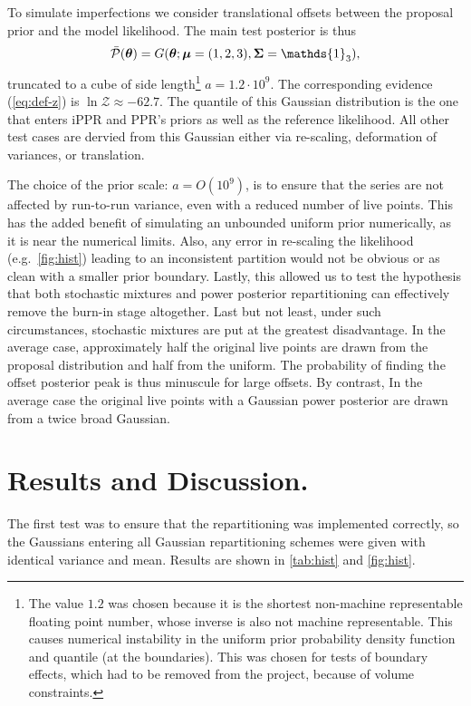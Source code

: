 \documentclass[usenatbib]{mnras}
\begin{document}
To simulate imperfections we consider translational offsets between
the proposal prior and the model likelihood.  The main test posterior
is thus
\begin{equation}
\bar{{\cal P}}(\bm{\theta}) = G(\bm{\theta}; \bm{\mu} =
  (1,2,3),\bm{\Sigma} = \mathds{1}_{3}),
\end{equation}
truncated to a cube of side length\footnote{The value \(1.2\) was
  chosen because it is the shortest non-machine representable floating
  point number, whose inverse is also not machine representable. This
  causes numerical instability in the uniform prior probability
  density function and quantile (at the boundaries). This was chosen
  for tests of boundary effects, which had to be removed from the
  project, because of volume constraints. } \(a = 1.2 \cdot
10^{9}\). The corresponding evidence (\cref{eq:def-z}) is
\(\ln \mathcal{Z}\approx-62.7\). The quantile of this Gaussian
distribution is the one that enters iPPR and PPR's priors as well as
the reference likelihood. All other test cases are dervied from this
Gaussian either via re-scaling, deformation of variances, or
translation.

The choice of the prior scale: \(a = O(10^{9})\), is to ensure that
the series are not affected by run-to-run variance, even with a
reduced number of live points. This has the added benefit of
simulating an unbounded uniform prior numerically, as it is near the
numerical limits. Also, any error in re-scaling the likelihood
(e.g.~\cref{fig:hist}) leading to an inconsistent partition would not
be obvious or as clean with a smaller prior boundary. Lastly, this
allowed us to test the hypothesis that both stochastic mixtures and
power posterior repartitioning can effectively remove the burn-in
stage altogether. Last but not least, under such circumstances,
stochastic mixtures are put at the greatest disadvantage. In the
average case, approximately half the original live points are drawn
from the proposal distribution and half from the uniform. The
probability of finding the offset posterior peak is thus minuscule for
large offsets. By contrast, In the average case the original live
points with a Gaussian power posterior are drawn from a twice broad
Gaussian.



\section{Results and Discussion.}\label{sec:results}
The first test was to ensure that the repartitioning was implemented
correctly, so the Gaussians entering all Gaussian repartitioning
schemes were given with identical variance and mean. Results are shown
in \cref{tab:hist} and \cref{fig:hist}.
\end{document}

